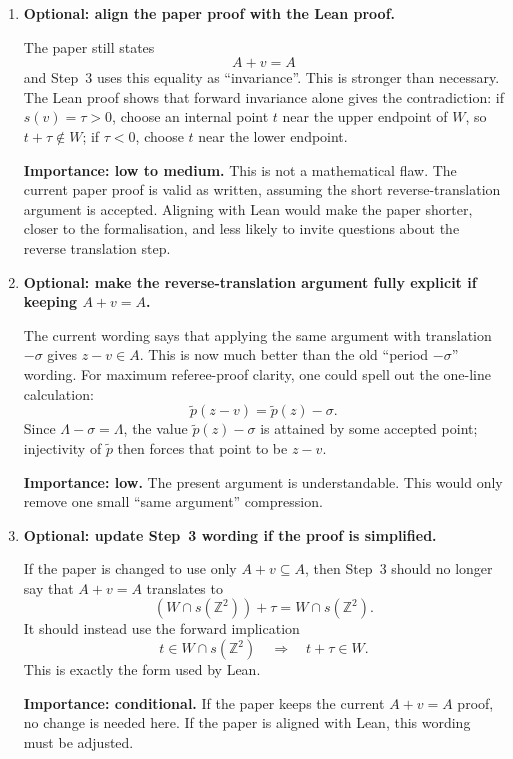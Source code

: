 \documentclass[11pt]{article}
\begin{document}
\begin{enumerate}[label=\textbf{R\arabic*.},leftmargin=*]

\item \textbf{Optional: align the paper proof with the Lean proof.}

The paper still states
\[
  A+v=A
\]
and Step~3 uses this equality as ``invariance''.  This is stronger than
necessary.  The Lean proof shows that forward invariance alone gives the
contradiction: if \(s(v)=\tau>0\), choose an internal point \(t\) near the
upper endpoint of \(W\), so \(t+\tau\notin W\); if \(\tau<0\), choose \(t\)
near the lower endpoint.

\textbf{Importance: low to medium.}  This is not a mathematical flaw.  The
current paper proof is valid as written, assuming the short reverse-translation
argument is accepted.  Aligning with Lean would make the paper shorter, closer
to the formalisation, and less likely to invite questions about the reverse
translation step.

\item \textbf{Optional: make the reverse-translation argument fully explicit
if keeping \(A+v=A\).}

The current wording says that applying the same argument with translation
\(-\sigma\) gives \(z-v\in A\).  This is now much better than the old
``period \(-\sigma\)'' wording.  For maximum referee-proof clarity, one could
spell out the one-line calculation:
\[
  \tilde p(z-v)=\tilde p(z)-\sigma.
\]
Since \(\Lambda-\sigma=\Lambda\), the value \(\tilde p(z)-\sigma\) is
attained by some accepted point; injectivity of \(\tilde p\) then forces that
point to be \(z-v\).

\textbf{Importance: low.}  The present argument is understandable.  This
would only remove one small ``same argument'' compression.

\item \textbf{Optional: update Step~3 wording if the proof is simplified.}

If the paper is changed to use only \(A+v\subseteq A\), then Step~3 should no
longer say that \(A+v=A\) translates to
\[
  (W\cap s(\mathbb Z^2))+\tau
  =
  W\cap s(\mathbb Z^2).
\]
It should instead use the forward implication
\[
  t\in W\cap s(\mathbb Z^2)
  \quad\Longrightarrow\quad
  t+\tau\in W.
\]
This is exactly the form used by Lean.

\textbf{Importance: conditional.}  If the paper keeps the current
\(A+v=A\) proof, no change is needed here.  If the paper is aligned with Lean,
this wording must be adjusted.

\end{enumerate}
\end{document}

